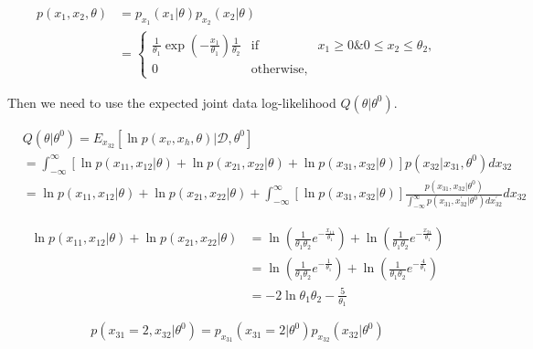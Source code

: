 \documentclass{article}
\begin{document}
\begin{equation}
\begin{aligned}
    p(x_1,x_2,\theta) & = p_{x_1}(x_1 | \theta) p_{x_2}(x_2 | \theta) \\
                      & = \left\{\begin{array}{rcl}
\frac{1}{\theta_1} \exp(-\frac{x_1}{\theta_1}) \frac{1}{\theta_2}  & \mbox{if} & x_1 \geq 0  \&  0 \leq x_2 \leq \theta_2,\\ 
0  & \mbox{otherwise} ,
\end{array}\right. 
\end{aligned}
\end{equation}

Then we need to use the expected joint data log-likelihood $Q(\theta | \theta^{0})$.

\begin{equation}
\begin{aligned}
& Q(\theta | \theta^{0})  = E_{x_{32}}[\ln{p(x_v,x_h,\theta)} | \mathcal{D},\theta^{0}] \\
& = \int_{-\infty}^{\infty} [\ln{p(x_{11},x_{12} | \theta)} + \ln{p(x_{21},x_{22} | \theta)}+ \ln{p(x_{31},x_{32} | \theta)}] p(x_{32} |x_{31},\theta^{0}) dx_{32} \\
& = \ln{p(x_{11},x_{12} | \theta)} + \ln{p(x_{21},x_{22} | \theta)} + \int_{-\infty}^{\infty} [ \ln{p(x_{31},x_{32} | \theta)}] \frac{p(x_{31},x_{32}|\theta^{0})}{\int_{-\infty}^{\infty} p(x_{31}, x_{32}^{'} |\theta^{0}) dx_{32}^{'} } dx_{32}
\end{aligned}
\end{equation}

\begin{equation}
\begin{aligned}
\ln{p(x_{11},x_{12} | \theta)} + \ln{p(x_{21},x_{22} | \theta)} & = \ln(\frac{1}{\theta_1 \theta_2}e^{-\frac{x_{11}}{\theta_1}}) +\ln(\frac{1}{\theta_1 \theta_2}e^{-\frac{x_{21}}{\theta_1}})  \\
& =\ln(\frac{1}{\theta_1 \theta_2}e^{-\frac{1}{\theta_1}}) +\ln(\frac{1}{\theta_1 \theta_2}e^{-\frac{4}{\theta_1}}) \\
& = -2 \ln{\theta_1 \theta_2} -\frac{5}{\theta_1}
\end{aligned}
\end{equation}

\begin{equation}
p(x_{31}=2,x_{32} | \theta^{0}) = p_{x_{31}}(x_{31}=2|\theta^{0}) p_{x_{32}}(x_{32}|\theta^{0})    
\end{equation}
\end{document}

